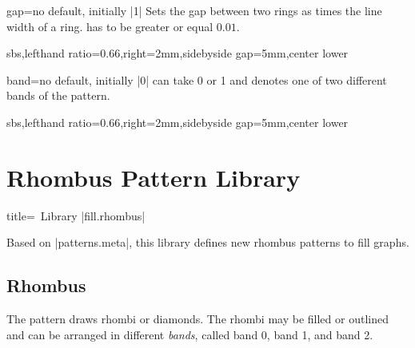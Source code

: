 \documentclass[a4paper,11pt]{article}
\begin{document}
\begin{docPatternKey}{gap}{=}{no default, initially |1|}
  Sets the gap between two rings as  times the line width of a ring.
   has to be greater or equal $0.01$.

\begin{dispExample*}{sbs,lefthand ratio=0.66,right=2mm,sidebyside gap=5mm,center lower}
\end{dispExample*}
\end{docPatternKey}


\begin{docPatternKey}{band}{=}{no default, initially |0|}
   can take 0 or 1 and denotes one of two different bands of the pattern.
\begin{dispExample*}{sbs,lefthand ratio=0.66,right=2mm,sidebyside gap=5mm,center lower}
\end{dispExample*}
\end{docPatternKey}



\clearpage
\section{Rhombus Pattern Library}\label{sec:rhombus}%

\begin{dispListing*}{title=\tikzname\ Library |fill.rhombus|}
\usetikzlibrary{fill.rhombus} %
\usepackage{tikzfill.rhombus} %
\end{dispListing*}

Based on |patterns.meta|, this library defines new rhombus patterns to fill graphs.

\subsection{Rhombus}
The  pattern draws rhombi or diamonds. The rhombi may be
filled or outlined and can be arranged in different \emph{bands}, called band 0, band 1, and band 2.
\end{document}
